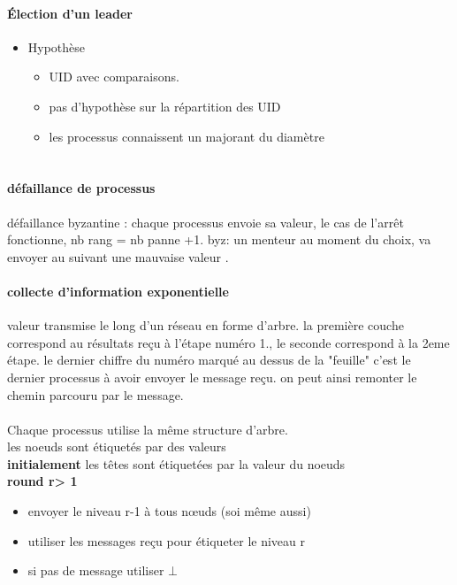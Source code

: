 \documentclass{article}
\begin{document}
\paragraph{Élection d'un leader}
\begin{itemize}
\item Hypothèse
\begin{itemize}
\item UID avec comparaisons.
\item pas d'hypothèse sur la répartition des UID
\item les processus connaissent un majorant du diamètre
\end{itemize}
\end{itemize}

\section{}
\date{14 Février 2013}
\paragraph{défaillance de processus} défaillance byzantine : chaque processus envoie sa valeur, le cas de l’arrêt fonctionne, nb rang = nb panne +1. byz: un menteur au moment du choix, va envoyer au suivant une mauvaise valeur .
\paragraph{collecte d'information exponentielle} valeur transmise le long d'un réseau en forme d'arbre. la première couche correspond au résultats reçu à l'étape numéro 1., le seconde correspond à la 2eme étape. le dernier chiffre du numéro marqué au dessus de la "feuille" c’est le dernier processus à avoir envoyer le message reçu. on peut ainsi remonter le chemin parcouru par le message.\\\\Chaque processus utilise la même structure d'arbre.\\les noeuds sont étiquetés par des valeurs\\\textbf{initialement} les têtes sont étiquetées par la valeur du noeuds\\\textbf{round r> 1} \begin{itemize}
\item envoyer le niveau r-1 à tous nœuds (soi même aussi)
\item utiliser les messages reçu pour étiqueter le niveau r
\item si pas de message utiliser $\bot$
\end{itemize}
\end{document}
